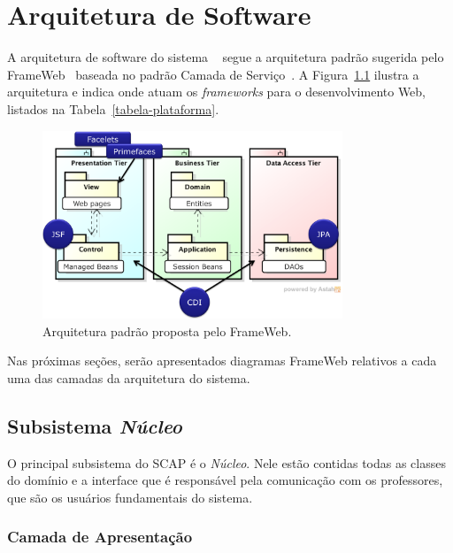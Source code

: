 
\chapter{Arquitetura de Software}
\label{sec-arquitetura}

A arquitetura de software do sistema~\imprimirtitulo \,\, segue a arquitetura padrão sugerida pelo FrameWeb~\cite{souza:masterthesis07,souza-et-al:iism09} baseada no padrão Camada de Serviço~\cite{fowler:book02}. A Figura~\ref{figura-arquitetura-padrao} ilustra a arquitetura e indica onde atuam os \textit{frameworks} para o desenvolvimento Web, listados na Tabela~\ref{tabela-plataforma}.

\begin{figure}[h]
	\centering
	\includegraphics[width=0.8\textwidth]{figuras/figura-arquitetura-padrao.png}
	\caption{Arquitetura padrão proposta pelo FrameWeb.}
	\label{figura-arquitetura-padrao}
\end{figure}

Nas próximas seções, serão apresentados diagramas FrameWeb relativos a cada uma das camadas da arquitetura do sistema.

\section{Subsistema \textit{Núcleo}}

O principal subsistema do SCAP é o \textit{Núcleo}. Nele estão contidas todas as classes do domínio e a interface que é responsável pela comunicação com os professores, que são os usuários fundamentais do sistema.

\subsection{Camada de Apresentação}
\label{subsec-arquitetura-apresentacao-nucleo}

